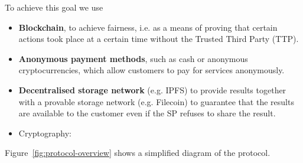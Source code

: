\documentclass[pdftex,twocolumn,epjc3]{svjour3}
\begin{document}
To achieve this goal we use
\begin{itemize}
    \item \textbf{Blockchain}, to achieve fairness, i.e. as a means of proving that certain actions took place at a certain time without the Trusted Third Party (TTP).
    \item \textbf{Anonymous payment methods}, such as cash or anonymous cryptocurrencies, which allow customers to pay for services anonymously.
    \item \textbf{Decentralised storage network} (e.g. IPFS) to provide results together with a provable storage network (e.g. Filecoin) to guarantee that the results are available to the customer even if the SP refuses to share the result.
    
    \item Cryptography:
    
\end{itemize}

Figure~\ref{fig:protocol-overview} shows a simplified diagram of the protocol.
\end{document}
